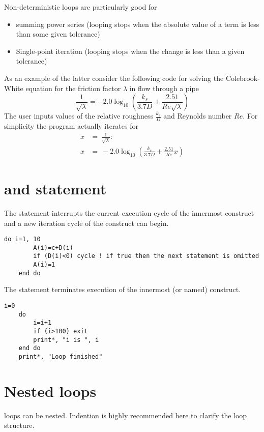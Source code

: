 \documentclass[class=book,crop=false]{standalone}
\begin{document}
Non-deterministic  loops are particularly good for
\begin{itemize}
    \item summing power series (looping stops when the absolute value of a term is less than some given tolerance)
    \item Single-point iteration (looping stops when the change is less than a given tolerance)
\end{itemize}
As an example of the latter consider the following code for solving the Colebrook-White equation for the friction factor $ \lambda $ in flow through a pipe
\[\frac{1}{\sqrt{\lambda}}=-2.0\log_{10} \left(\frac{k_s}{3.7D}+\frac{2.51}{Re\sqrt{\lambda}}\right)\]
The user inputs values of the relative roughness $ \frac{k_s}{D} $ and Reynolds number $ Re $. For simplicity the program actually iterates for
\begin{align*}
    x &=\ \frac{1}{\sqrt{\lambda}} :\\
    x &=\ -2.0\log_{10} \left(\frac{k_s}{3.7D}+\frac{2.51}{Re}x\right)
\end{align*}

\section{ and  statement}
The  statement interrupts the current execution cycle of the innermost  construct and a new iteration cycle of the  construct can begin.
\begin{lstlisting}[numbers=none]
    do i=1, 10
        A(i)=c+D(i)
        if (D(i)<0) cycle ! if true then the next statement is omitted
        A(i)=1
    end do
\end{lstlisting}
The   statement terminates execution of the innermost (or named)  construct.
\begin{lstlisting}[numbers=none]
    i=0
    do
        i=i+1
        if (i>100) exit
        print*, "i is ", i
    end do
    print*, "Loop finished"
\end{lstlisting}
\section{Nested  loops}
 loops can be nested. Indention is highly recommended here to clarify the loop structure.

\end{document}
